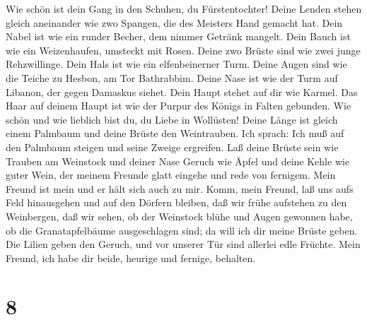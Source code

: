  Wie schön ist dein Gang in den Schuhen, du Fürstentochter!
Deine Lenden stehen gleich aneinander wie zwo Spangen, die des Meisters
Hand gemacht hat.  Dein Nabel ist wie ein runder Becher, dem
nimmer Getränk mangelt. Dein Bauch ist wie ein Weizenhaufen, umsteckt
mit Rosen.  Deine zwo Brüste sind wie zwei junge
Rehzwillinge.  Dein Hals ist wie ein elfenbeinerner Turm.
Deine Augen sind wie die Teiche zu Hesbon, am Tor Bathrabbim. Deine Nase
ist wie der Turm auf Libanon, der gegen Damaskus siehet. 
Dein Haupt stehet auf dir wie Karmel. Das Haar auf deinem Haupt ist wie
der Purpur des Königs in Falten gebunden.  Wie schön und wie
lieblich bist du, du Liebe in Wollüsten!  Deine Länge ist
gleich einem Palmbaum und deine Brüste den Weintrauben.  Ich
sprach: Ich muß auf den Palmbaum steigen und seine Zweige ergreifen. Laß
deine Brüste sein wie Trauben am Weinstock und deiner Nase Geruch wie
Äpfel  und deine Kehle wie guter Wein, der meinem Freunde
glatt eingehe und rede von fernigem.  Mein Freund ist mein
und er hält sich auch zu mir.  Komm, mein Freund, laß uns
aufs Feld hinausgehen und auf den Dörfern bleiben,  daß wir
frühe aufstehen zu den Weinbergen, daß wir sehen, ob der Weinstock blühe
und Augen gewonnen habe, ob die Granatapfelbäume ausgeschlagen sind; da
will ich dir meine Brüste geben.  Die Lilien geben den
Geruch, und vor unserer Tür sind allerlei edle Früchte. Mein Freund, ich
habe dir beide, heurige und fernige, behalten.

\hypertarget{section-7}{%
\section{8}\label{section-7}}

